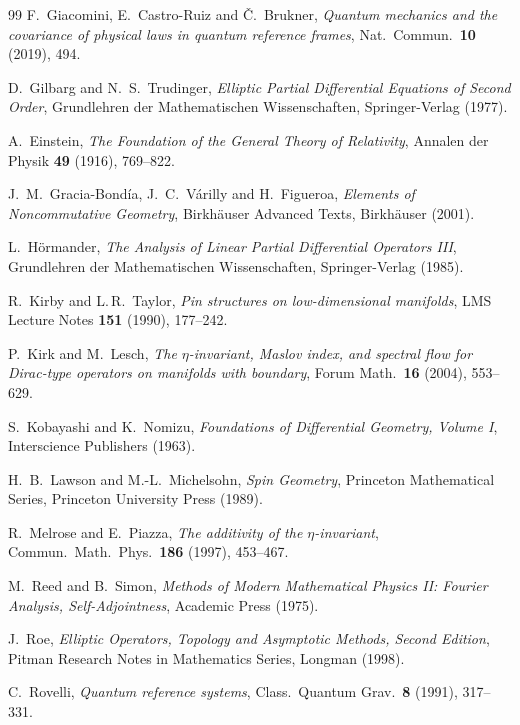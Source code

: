 \documentclass[11pt]{amsart}
\theoremstyle{definition}
\theoremstyle{remark}
\begin{document}
\begin{thebibliography}{99}
F.~Giacomini, E.~Castro-Ruiz and Č.~Brukner,
\textit{Quantum mechanics and the covariance of physical laws in quantum reference frames},
Nat.\ Commun.\ \textbf{10} (2019), 494.

D.~Gilbarg and N.~S.~Trudinger,
\textit{Elliptic Partial Differential Equations of Second Order},
Grundlehren der Mathematischen Wissenschaften, Springer-Verlag (1977).

A.~Einstein, 
\textit{The Foundation of the General Theory of Relativity}, 
Annalen der Physik {\bf 49} (1916), 769--822.

J.~M.~Gracia-Bondía, J.~C.~Várilly and H.~Figueroa,
\textit{Elements of Noncommutative Geometry},
Birkhäuser Advanced Texts, Birkhäuser (2001).

L.~Hörmander,
\textit{The Analysis of Linear Partial Differential Operators III},
Grundlehren der Mathematischen Wissenschaften, Springer-Verlag (1985).

R.~Kirby and L.\,R.~Taylor,
\textit{Pin structures on low-dimensional manifolds},
LMS Lecture Notes \textbf{151} (1990), 177–242.

P.~Kirk and M.~Lesch,
\textit{The $\eta$-invariant, Maslov index, and spectral flow for Dirac-type operators on manifolds with boundary},
Forum Math.\ \textbf{16} (2004), 553–629.

S.~Kobayashi and K.~Nomizu,
\textit{Foundations of Differential Geometry, Volume I},
Interscience Publishers (1963).

H.~B.~Lawson and M.-L.~Michelsohn,
\textit{Spin Geometry},
Princeton Mathematical Series, Princeton University Press (1989).

R.~Melrose and E.~Piazza,
\textit{The additivity of the $\eta$-invariant},
Commun.\ Math.\ Phys.\ \textbf{186} (1997), 453–467.

M.~Reed and B.~Simon,
\textit{Methods of Modern Mathematical Physics II: Fourier Analysis, Self-Adjointness},
Academic Press (1975).

J.~Roe,
\textit{Elliptic Operators, Topology and Asymptotic Methods, Second Edition},
Pitman Research Notes in Mathematics Series, Longman (1998).

C.~Rovelli,
\textit{Quantum reference systems},
Class.\ Quantum Grav.\ \textbf{8} (1991), 317–331.


\end{thebibliography}
\end{document}
